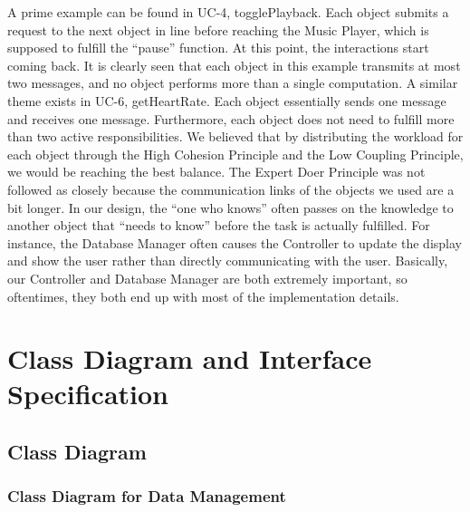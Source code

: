 \documentclass[letterpaper,english, 12pt]{scrreprt}
\begin{document}
A prime example can be found in UC-4, togglePlayback. Each object submits a request to the next object in line before reaching the Music Player, which is supposed to fulfill the ``pause'' function. At this point, the interactions start coming back. It is clearly seen that each object in this example transmits at most two messages, and no object performs more than a single computation. A similar theme exists in UC-6, getHeartRate. Each object essentially sends one message and receives one message. Furthermore, each object does not need to fulfill more than two active responsibilities. We believed that by distributing the workload for each object through the High Cohesion Principle and the Low Coupling Principle, we would be reaching the best balance.
The Expert Doer Principle was not followed as closely because the communication links of the objects we used are a bit longer. In our design, the ``one who knows'' often passes on the knowledge to another object that ``needs to know'' before the task is actually fulfilled. For instance, the Database Manager often causes the Controller to update the display and show the user rather than directly communicating with the user. Basically, our Controller and Database Manager are both extremely important, so oftentimes, they both end up with most of the implementation details.

\chapter{Class Diagram and Interface Specification}

\section{Class Diagram}
\subsection{Class Diagram for Data Management}
\end{document}
